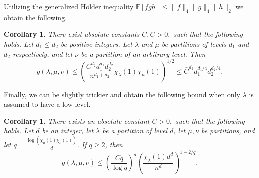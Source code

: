 \documentclass[11pt, letterpaper]{amsart}
\newtheorem{cor}[thm]{Corollary}
\newcommand{\remove}[1]{}
\renewcommand\ge{\geqslant}
\renewcommand\le{\leqslant}
\begin{document}
Utilizing the generalized H\"{o}lder inequality $\mathbb{E}[fgh]\le \|f\|_4\|g\|_4\|h\|_2$ we obtain the following.

\begin{cor}\label{cor: Assymetric Kronecker coefficients 1}
There exist absolute constants $C,\bar{C}>0,$ such that the following holds. Let $d_1\le d_2$ be positive integers. Let $\lambda$ and $\mu $ be partitions of levels $d_1$ and $d_2$ respectively, and let $\nu$ be a partition of an arbitrary level.
Then
\[
g(\lambda, \mu, \nu) \le \left(\frac{C^{d_2}d_1^{d_1}d_2^{d_2}}{n^{d_1+d_2}}\chi_{\lambda}(1)\chi_{\mu}(1)\right)^{1/2} \le \bar{C}^{d_{2}}d_{1}^{d_{1}/4}d_{2}^{d_{2}/4}.
\]
\end{cor}

Finally, we can be slightly trickier and obtain the following bound when only $\lambda$ is assumed to have a low level. 

\begin{cor}\label{cor: Assymetric Kronecker coefficients 2}
There exists an absolute constant $C>0,$ such that the following holds. Let $d$ be an integer, let $\lambda$ be a partition of level $d$, let $\mu, \nu$ be partitions, and let $q=\frac{\log(\chi_\mu(1)\chi_{\nu}(1))}{d}.$ 
If $q \ge 2$, then
\[
g(\lambda, \mu, \nu) \le \left( \frac{Cq}{\log q}\right)^d\left(\frac{\chi_{\lambda}(1)d^d}{n^d}\right)^{1-2/q}. 
\]
\end{cor}
 
\remove{ 
Using the fact $\sum_{\nu \vdash n} g(\lambda,\lambda,\nu)^2 = \|\chi_\lambda\|_4^4$, we get a similar bound for Kronecker coefficients of the form $g(\lambda,\lambda,\nu)$.
\begin{cor}\label{cor: another bound for Kronecker coefficients}
Let $d\le n/10$ Let $\lambda \vdash n$ be a partition of level $d$.
Then there exists an absolute constant $C>0,$ such that for all $\nu \vdash n$
\[
g(\lambda, \lambda, \nu) \le \left(\frac{Cd}{n}\right)^{d}\chi_{\lambda}(1). 
\]
\end{cor}

This bound is slightly better in the case where $\chi_\mu(1) >> \chi_\lambda(1)$. We can also use the formula $\sum_{\nu \vdash n} g(\lambda,\lambda,\nu)^2 = \|\chi_\lambda\|_4^4$ to lower bound $\max_{\nu \vdash n} g(\lambda, \lambda, \nu)$ by $\left(\frac{Cd}{n \log d}\right)^{d}\chi_{\lambda}(1)$ divided by $\#\{\nu \vdash n \mid \nu_1 \ge n-2d\} \approx \#\{\nu \vdash d\} \approx e^{\tilde{c}\sqrt{d}}$.  check if this is better than naive bounds. Also check if we should use $\sum_{\nu \vdash n} g(\lambda,\mu,\nu)^2 = \|\chi_\lambda\chi_\mu\|_2^2$ or something like this to improve bounds.
}
\end{document}
